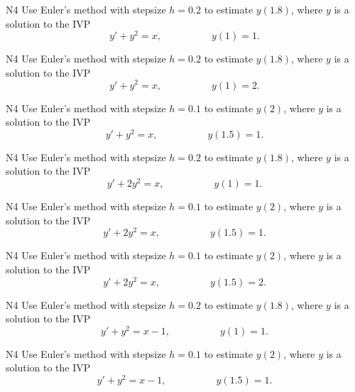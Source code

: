 \begin{problem}{N4}
Use Euler's method with stepsize \(h=0.2\) to estimate \(y(1.8)\), where \(y\) is a solution to the IVP
\[y'+y^2=x,\hspace{5em}y(1)=1.\]
\end{problem}

\begin{problem}{N4}
Use Euler's method with stepsize \(h=0.2\) to estimate \(y(1.8)\), where \(y\) is a solution to the IVP
\[y'+y^2=x,\hspace{5em}y(1)=2.\]
\end{problem}

\begin{problem}{N4}
Use Euler's method with stepsize \(h=0.1\) to estimate \(y(2)\), where \(y\) is a solution to the IVP
\[y'+y^2=x,\hspace{5em}y(1.5)=1.\]
\end{problem}

\begin{problem}{N4}
Use Euler's method with stepsize \(h=0.2\) to estimate \(y(1.8)\), where \(y\) is a solution to the IVP
\[y'+2y^2=x,\hspace{5em}y(1)=1.\]
\end{problem}

\begin{problem}{N4}
Use Euler's method with stepsize \(h=0.1\) to estimate \(y(2)\), where \(y\) is a solution to the IVP
\[y'+2y^2=x,\hspace{5em}y(1.5)=1.\]
\end{problem}

\begin{problem}{N4}
Use Euler's method with stepsize \(h=0.1\) to estimate \(y(2)\), where \(y\) is a solution to the IVP
\[y'+2y^2=x,\hspace{5em}y(1.5)=2.\]
\end{problem}

\begin{problem}{N4}
Use Euler's method with stepsize \(h=0.2\) to estimate \(y(1.8)\), where \(y\) is a solution to the IVP
\[y'+y^2=x-1,\hspace{5em}y(1)=1.\]
\end{problem}

\begin{problem}{N4}
Use Euler's method with stepsize \(h=0.1\) to estimate \(y(2)\), where \(y\) is a solution to the IVP
\[y'+y^2=x-1,\hspace{5em}y(1.5)=1.\]
\end{problem}

